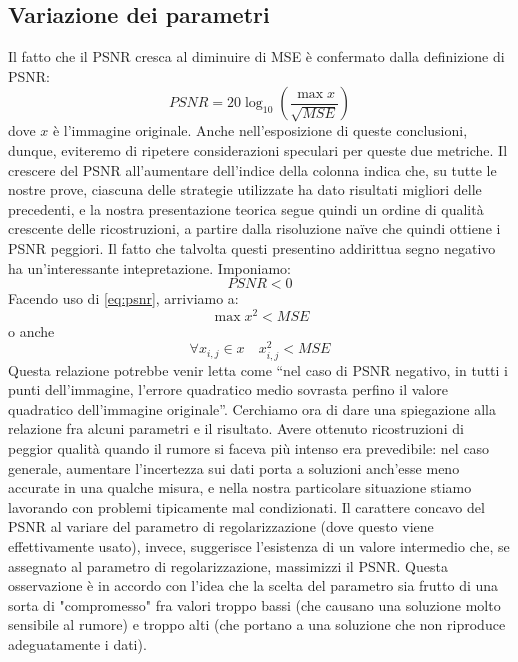 \documentclass[a4paper]{article}
\begin{document}
\subsection{Variazione dei parametri}
Il fatto che il PSNR cresca al diminuire di MSE è confermato dalla definizione
di PSNR:
\begin{equation}\label{eq:psnr}
  PSNR = 20 \log_{10}(\frac{\max{x}}{\sqrt{MSE}})
\end{equation}
dove $x$ è l'immagine originale. Anche nell'esposizione di queste conclusioni,
dunque, eviteremo di ripetere considerazioni speculari per queste due metriche.
Il crescere del PSNR all'aumentare dell'indice della colonna indica che, su
tutte le nostre prove, ciascuna delle strategie utilizzate ha dato risultati
migliori delle precedenti, e la nostra presentazione teorica segue quindi un
ordine di qualità crescente delle ricostruzioni, a partire dalla risoluzione
naïve che quindi ottiene i PSNR peggiori. Il fatto che talvolta questi
presentino addirittua segno negativo ha un'interessante intepretazione.
Imponiamo:
\begin{equation}
  PSNR < 0
\end{equation}
Facendo uso di \eqref{eq:psnr}, arriviamo a:
\begin{equation}
  \max{x^2} < MSE
\end{equation}
o anche
\begin{equation}
  \forall x_{i,j} \in x \quad x_{i,j}^2 < MSE
\end{equation}
Questa relazione potrebbe venir letta come ``nel caso di PSNR negativo, in tutti
i punti dell'immagine, l'errore quadratico medio sovrasta perfino il valore
quadratico dell'immagine originale''. Cerchiamo ora di dare una spiegazione alla
relazione fra alcuni parametri e il risultato. Avere ottenuto ricostruzioni di
peggior qualità quando il rumore si faceva più intenso era prevedibile: nel caso
generale, aumentare l'incertezza sui dati porta a soluzioni anch'esse meno
accurate in una qualche misura, e nella nostra particolare situazione stiamo
lavorando con problemi tipicamente mal condizionati. Il carattere concavo del
PSNR al variare del parametro di regolarizzazione (dove questo viene
effettivamente usato), invece, suggerisce l'esistenza di un valore intermedio
che, se assegnato al parametro di regolarizzazione, massimizzi il PSNR. Questa
osservazione è in accordo con l'idea che la scelta del parametro sia frutto di
una sorta di "compromesso" fra valori troppo bassi (che causano una soluzione
molto sensibile al rumore) e troppo alti (che portano a una soluzione che non
riproduce adeguatamente i dati).
\end{document}

